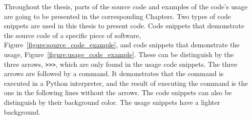 \begin{table}[htbp]
    \centering
    \caption{Citations and GitHub url for source code and data used in the thesis.}
    \label{table:source_code_data_citations}
\end{table}

Throughout the thesis, parts of the source code and examples of the code's usage are
going to be presented in the corresponding Chapters. Two types of code snippets
are used in this thesis to present code. Code snippets that demonstrate the
source code of a specific piece of software, Figure~\ref{figure:source_code_example}, and
code snippets that demonstrate the usage,
Figure~\ref{figure:usage_code_example}. These can be distinguish by the three arrows,
\texttt{>>>}, which are only found in the usage code snippets.
The three arrows are followed by a command. It
demonstrates that the command is executed in a Python interpreter, and the result of executing the command
is the one in the following lines without the arrows.
The code snippets can also be distinguish by their background color. The usage
snippets have a lighter background.

